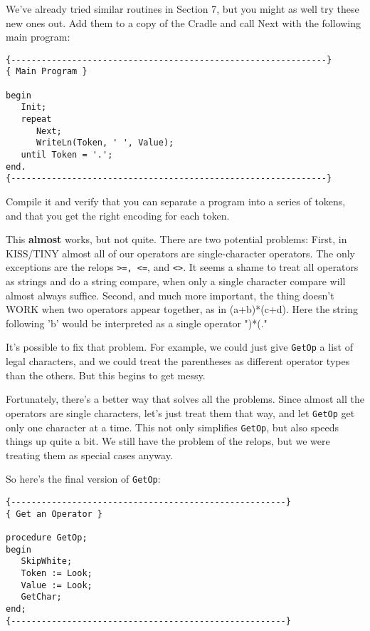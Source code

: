 We've already tried similar routines in Section 7, but  you might as well try these new ones out. Add them to a copy of the Cradle and call Next with the following main program:

\begin{verbatim}
{--------------------------------------------------------------}
{ Main Program }

begin
   Init;
   repeat
      Next;
      WriteLn(Token, ' ', Value);
   until Token = '.';
end.
{--------------------------------------------------------------}
\end{verbatim}

Compile  it and verify that you can separate  a  program  into  a series of tokens, and that you get the right  encoding  for  each token.

This {\bfseries almost} works, but  not  quite. There  are  two potential problems:    First, in KISS/TINY almost all of our operators are single-character operators. The only exceptions  are  the relops {\tt >=, <=}, and {\tt <>}. It seems  a  shame  to  treat  all  operators as strings and do a  string  compare, when  only a single character compare  will  almost  always  suffice. Second, and  much  more important, the  thing  doesn't  WORK  when  two  operators appear together, as in (a+b)*(c+d). Here the string following 'b' would be interpreted as a single operator ")*(."

It's possible to fix that problem. For example, we  could  just give {\tt GetOp} a  list  of  legal  characters, and we could treat the parentheses as different operator types  than  the  others. But this begins to get messy.

Fortunately, there's a  better  way that solves all the problems. Since almost  all the operators are single characters, let's just treat  them  that  way, and let {\tt GetOp} get only one character at a time. This not only simplifies {\tt GetOp}, but also speeds  things up quite a  bit. We  still have the problem of the relops, but we were treating them as special cases anyway.

So here's the final version of {\tt GetOp}:

\begin{verbatim}
{------------------------------------------------------}
{ Get an Operator }

procedure GetOp;
begin
   SkipWhite;
   Token := Look;
   Value := Look;
   GetChar;
end;
{------------------------------------------------------}
\end{verbatim}

